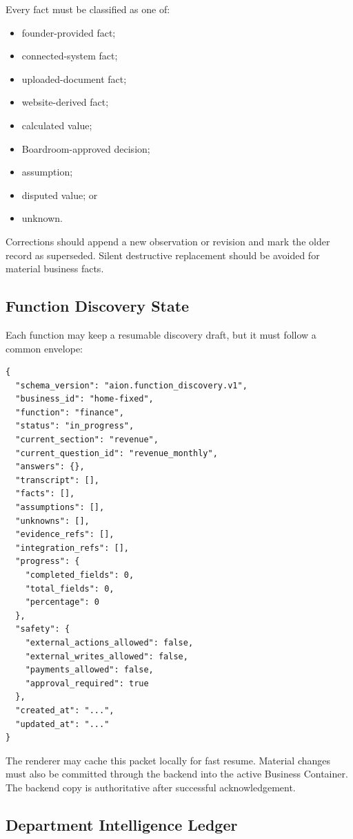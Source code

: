 Every fact must be classified as one of:

\begin{itemize}
  \item founder-provided fact;
  \item connected-system fact;
  \item uploaded-document fact;
  \item website-derived fact;
  \item calculated value;
  \item Boardroom-approved decision;
  \item assumption;
  \item disputed value; or
  \item unknown.
\end{itemize}

Corrections should append a new observation or revision and mark the older record
as superseded. Silent destructive replacement should be avoided for material
business facts.

\subsection{Function Discovery State}

Each function may keep a resumable discovery draft, but it must follow a common
envelope:

\begin{verbatim}
{
  "schema_version": "aion.function_discovery.v1",
  "business_id": "home-fixed",
  "function": "finance",
  "status": "in_progress",
  "current_section": "revenue",
  "current_question_id": "revenue_monthly",
  "answers": {},
  "transcript": [],
  "facts": [],
  "assumptions": [],
  "unknowns": [],
  "evidence_refs": [],
  "integration_refs": [],
  "progress": {
    "completed_fields": 0,
    "total_fields": 0,
    "percentage": 0
  },
  "safety": {
    "external_actions_allowed": false,
    "external_writes_allowed": false,
    "payments_allowed": false,
    "approval_required": true
  },
  "created_at": "...",
  "updated_at": "..."
}
\end{verbatim}

The renderer may cache this packet locally for fast resume. Material changes must
also be committed through the backend into the active Business Container. The
backend copy is authoritative after successful acknowledgement.

\subsection{Department Intelligence Ledger}

